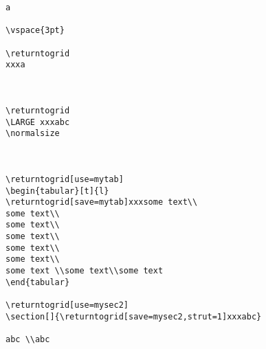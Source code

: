 \documentclass[twoside,parskip=half-,fontsize=12pt,egregdoesnotlikesansseriftitles,headings=normal]{scrartcl}
\begin{document}
\newpage
\ClearShipoutPictureBG
{}
\begin{lstlisting}
a

\vspace{3pt}

\returntogrid
xxxa



\returntogrid
\LARGE xxxabc
\normalsize



\returntogrid[use=mytab]
\begin{tabular}[t]{l}
\returntogrid[save=mytab]xxxsome text\\
some text\\
some text\\
some text\\
some text\\
some text\\
some text \\some text\\some text
\end{tabular}

\returntogrid[use=mysec2]
\section[]{\returntogrid[save=mysec2,strut=1]xxxabc}

abc \\abc
\end{lstlisting}
\end{document}
